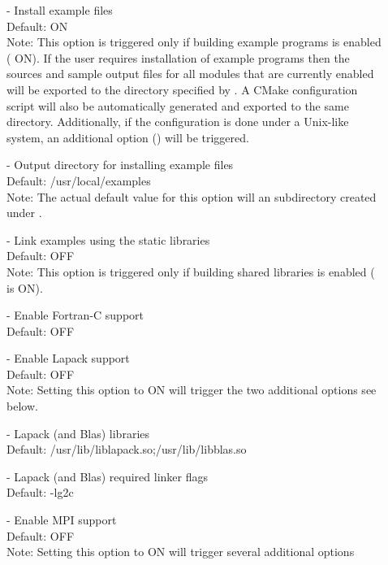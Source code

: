 \begin{description}
\item[] - 
  Install example files
  \\
  Default: ON
  \\
  Note: This option is triggered only if building example programs
  is enabled ( ON). If the user requires
  installation of example programs then the sources and sample output files
  for all {\sundials} modules that are currently enabled will be exported to
  the directory specified by . A CMake configuration
  script will also be automatically generated and exported to the same directory.
  Additionally, if the configuration is done under a Unix-like system, an additional
  option () will be triggered.
\item[] - 
  Output directory for installing example files
  \\
  Default: /usr/local/examples
  \\
  Note: The actual default value for this option will an 
  subdirectory created under .
\item[] - 
  Link examples using the static libraries
  \\
  Default: OFF
  \\
  Note: This option is triggered only if building shared
  libraries is enabled ( is ON).
\item[] - 
  Enable Fortran-C support   
  \\
  Default: OFF 
\item[] -  
  Enable Lapack support
  \\
  Default: OFF
  \\
  Note: Setting this option to ON will trigger the two additional options
  see below.
\item[] - 
  Lapack (and Blas) libraries
  \\
  Default: /usr/lib/liblapack.so;/usr/lib/libblas.so
\item[] - 
  Lapack (and Blas) required linker flags
  \\
  Default: -lg2c
\item[] -  
  Enable MPI support
  \\
  Default: OFF 
  \\
  Note: Setting this option to ON will trigger several additional options

\end{description}
